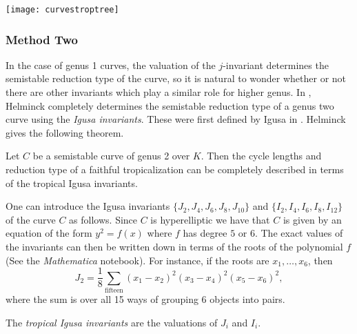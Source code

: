 \begin{center}
  \texttt{[image: curvestroptree]}
\end{center}


\subsubsection{Method Two}

 In the case of genus 1 curves, the valuation of the $j$-invariant determines the semistable reduction type of the curve, so it is natural to wonder whether or not there are other invariants which play a similar role for higher genus. In \cite{masters}, Helminck completely determines the semistable reduction type of a genus two curve using the \emph{Igusa invariants}. These were first defined by Igusa in \cite{igusa}. Helminck gives the following theorem.

\begin{theorem}
Let $C$ be a semistable curve of genus 2 over $K$. Then the cycle lengths and reduction type of a faithful tropicalization can be completely described in terms of the tropical Igusa invariants.
\end{theorem}




One can introduce the Igusa invariants $ \{J_2, J_4, J_6, J_8, J_{10}\}$ and $\{I_2, I_4, I_6, I_8, I_{12}\}$ of the curve $C$ as follows. Since $C$ is hyperelliptic we have that $C$ is given by an equation of the form $y^2 = f(x)$ where $f$ has degree $5$ or $6$. The exact values of the invariants can then be written down in terms of the roots of the polynomial $f$ (See the \emph{Mathematica} notebook). For instance, if the roots are $x_1, \ldots, x_6$, then
$$
J_2 = \frac{1}{8} \sum_{\text{fifteen}} (x_1-x_2)^2(x_3-x_4)^2(x_5-x_6)^2,
$$
where the sum is over all 15 ways of grouping 6 objects into pairs.

\begin{defn} The \emph{tropical Igusa invariants} are the valuations of $J_i$ and $I_i$. 
\end{defn}

